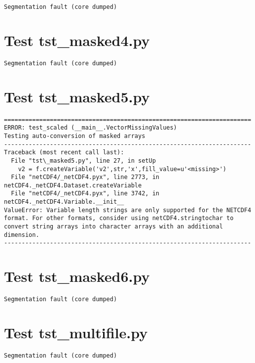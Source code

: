 \begin{verbatim}
Segmentation fault (core dumped)
\end{verbatim}

\section{Test tst\_masked4.py}

\begin{verbatim}
Segmentation fault (core dumped)
\end{verbatim}

\section{Test tst\_masked5.py}

\begin{verbatim}
======================================================================
ERROR: test_scaled (__main__.VectorMissingValues)
Testing auto-conversion of masked arrays
----------------------------------------------------------------------
Traceback (most recent call last):
  File "tst\_masked5.py", line 27, in setUp
    v2 = f.createVariable('v2',str,'x',fill_value=u'<missing>')
  File "netCDF4/_netCDF4.pyx", line 2773, in netCDF4._netCDF4.Dataset.createVariable
  File "netCDF4/_netCDF4.pyx", line 3742, in netCDF4._netCDF4.Variable.__init__
ValueError: Variable length strings are only supported for the NETCDF4 format. For other formats, consider using netCDF4.stringtochar to convert string arrays into character arrays with an additional dimension.
----------------------------------------------------------------------

\end{verbatim}

\section{Test tst\_masked6.py}

\begin{verbatim}
Segmentation fault (core dumped)
\end{verbatim}

\section{Test tst\_multifile.py}

\begin{verbatim}
Segmentation fault (core dumped)
\end{verbatim}

